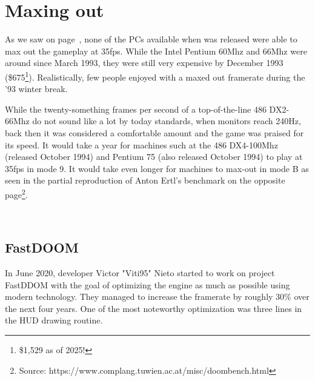 \section{Maxing out \doom{}}
As we saw on page~\pageref{benchmarks}, none of the PCs available when \doom{} was released were able to max out the gameplay at 35fps. While the Intel Pentium 60Mhz and 66Mhz were around since March 1993, they were still very expensive by December 1993 (\$675\footnote{\$1,529 as of 2025!}). Realistically, few people enjoyed \doom{} with a maxed out framerate during the '93 winter break.\\
\par
While the twenty-something frames per second of a top-of-the-line 486 DX2-66Mhz do not sound like a lot by today standards, when monitors reach 240Hz, back then it was considered a comfortable amount and the game was praised for its speed. It would take a year for machines such at the 486 DX4-100Mhz (released October 1994) and Pentium 75 (also released October 1994) to play at 35fps in mode 9. It would take even longer for machines to max-out \doom{} in mode B as seen in the partial reproduction of Anton Ertl's benchmark on the opposite page\footnote{Source: https://www.complang.tuwien.ac.at/misc/doombench.html}.\\
\par
{}\\
\par






\subsection{FastDOOM}

In June 2020, developer Victor "Viti95" Nieto started to work on project FastDDOM with the goal of optimizing the \doom{} engine as much as possible using modern technology. They managed to increase the framerate by roughly 30\% over the next four years. One of the most noteworthy optimization was three lines in the HUD drawing routine.\\
\par

